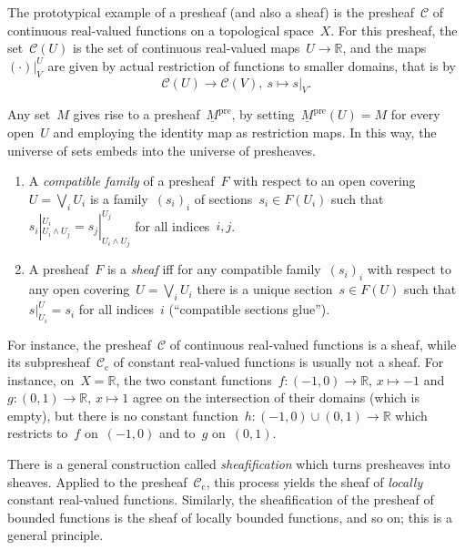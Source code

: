 \documentclass{ws-rv9x6}
\newcommand{\C}{\mathcal{C}}
\newcommand{\RR}{\mathbb{R}}
\renewcommand{\_}{\mathpunct{.}}
\newcommand{\?}{\,{:}\,}
\begin{document}
The prototypical example of a presheaf (and also a sheaf) is the presheaf~$\C$ of
continuous real-valued functions on a topological space~$X$. For this presheaf, the
set~$\C(U)$ is the set of continuous real-valued maps~$U \to \RR$, and the
maps~$(\cdot)|^U_V$ are given by actual restriction of functions to smaller
domains, that is by
\[ \C(U) \longrightarrow \C(V),\ s \longmapsto s|_V. \]

Any set~$M$ gives rise to a presheaf~$\underline{M}^\mathrm{pre}$, by
setting~$\underline{M}^\mathrm{pre}(U) = M$ for every open~$U$ and employing
the identity map as restriction maps. In this way, the universe of sets embeds
into the universe of presheaves.

\begin{definition}
\begin{enumerate}
\item A \emph{compatible family} of a presheaf~$F$ with respect to an open
covering~$U = \bigvee_i U_i$ is a family~$(s_i)_i$ of sections~$s_i \in F(U_i)$
such that~$s_i|^{U_i}_{U_i \wedge U_j} = s_j|^{U_j}_{U_i \wedge U_j}$ for all
indices~$i,j$.
\item A presheaf~$F$ is a \emph{sheaf}
iff for any compatible family~$(s_i)_i$ with respect to any open covering~$U =
\bigvee_i U_i$ there is a unique section~$s \in F(U)$ such
that~$s|^U_{U_i} = s_i$ for all indices~$i$ (``compatible sections glue'').
\end{enumerate}
\end{definition}

For instance, the presheaf~$\C$ of continuous real-valued functions is a sheaf,
while its subpresheaf~$\C_\text{c}$ of constant real-valued functions is
usually not a sheaf. For instance, on~$X = \RR$, the two constant functions~$f
: (-1,0) \to \RR,\,x \mapsto -1$ and~$g : (0,1) \to \RR,\,x \mapsto 1$ agree on
the intersection of their domains (which is empty), but there is no constant
function~$h : (-1,0) \cup (0,1) \to \RR$ which restricts to~$f$ on~$(-1,0)$ and
to~$g$ on~$(0,1)$.

There is a general construction called \emph{sheafification} which turns
presheaves into sheaves. Applied to the presheaf~$\C_\text{c}$, this process yields the
sheaf of \emph{locally} constant real-valued functions. Similarly, the
sheafification of the presheaf of bounded functions is the sheaf of locally
bounded functions, and so on; this is a general principle.
\end{document}
